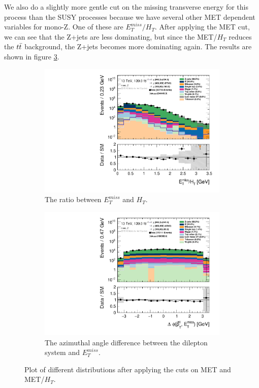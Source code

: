 We also do a slightly more gentle cut on the missing transverse energy for this process than the SUSY processes because we have several other MET dependent variables for mono-Z. One of these are $E_T^{miss}/H_T$. After applying the MET cut, we can see that the Z+jets are less dominating, but since the MET/$H_T$ reduces the $t\Bar{t}$ background, the Z+jets becomes more dominating again. The results are shown in figure \ref{fig:stepsDM2}.

\begin{figure}[H]
    \centering
    \begin{subfigure}[t!]{0.49\textwidth}
        \includegraphics[width=\textwidth]{Figures/MonoZcuts/hist1d_met_HT_mono_Z.pdf}
    \caption{The ratio between $E_T^{miss}$ and $H_T$.}
    \label{fig:metHTDM}
    \end{subfigure}
    \begin{subfigure}[t!]{0.49\textwidth}
        \includegraphics[width=\textwidth]{Figures/MonoZcuts/hist1d_deltaPhi_mono_Z.pdf}
    \caption{The azimuthal angle difference between the dilepton system and $E_T^{miss}$.}
    \label{fig:delphiDM}
    \end{subfigure}
    \caption{Plot of different distributions after applying the cuts on MET and MET/$H_T$.}
    \label{fig:stepsDM2}
\end{figure}


